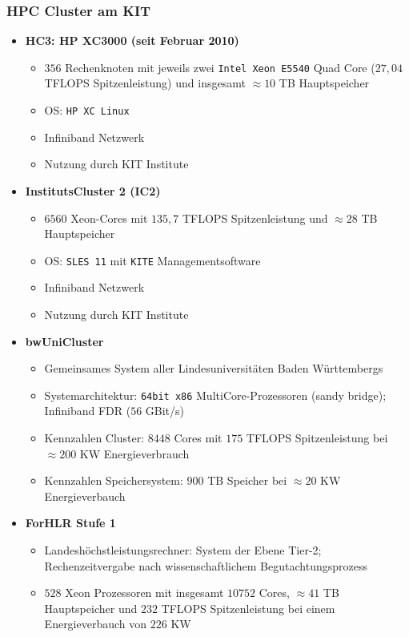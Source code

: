 \subsubsection{HPC Cluster am KIT}
\begin{itemize}
	\item \textbf{HC3: HP XC3000 (seit Februar 2010)}
	\begin{itemize}
		\item \(356\) Rechenknoten mit jeweils zwei \texttt{Intel Xeon E5540} Quad Core (\(27,04\) TFLOPS Spitzenleistung) und insgesamt \(\approx 10\) TB Hauptspeicher
		\item OS: \texttt{HP XC Linux}
		\item Infiniband Netzwerk
		\item Nutzung durch KIT Institute
	\end{itemize}
	\item \textbf{InstitutsCluster 2 (IC2)}
	\begin{itemize}
		\item \(6560\) Xeon-Cores mit \(135,7\) TFLOPS Spitzenleistung und \(\approx 28\) TB Hauptspeicher
		\item OS: \texttt{SLES 11} mit \texttt{KITE} Managementsoftware
		\item Infiniband Netzwerk
		\item Nutzung durch KIT Institute
	\end{itemize}
	\item \textbf{bwUniCluster}
	\begin{itemize}
		\item Gemeinsames System aller Lindesuniversitäten Baden Württembergs
		\item Systemarchitektur: \texttt{64bit x86} MultiCore-Prozessoren (sandy bridge); Infiniband FDR (\(56\) GBit/s)
		\item Kennzahlen Cluster: \(8448\) Cores mit \(175\) TFLOPS Spitzenleistung bei \(\approx 200\) KW Energieverbrauch
		\item Kennzahlen Speichersystem: \(900\) TB Speicher bei \(\approx 20\) KW Energieverbauch
	\end{itemize}
	\item \textbf{ForHLR Stufe 1}
	\begin{itemize}
		\item Landeshöchstleistungsrechner: System der Ebene Tier-2; Rechenzeitvergabe nach wissenschaftlichem Begutachtungsprozess
		\item \(528\) Xeon Prozessoren mit insgesamt \(10752\) Cores, \(\approx 41\) TB Hauptspeicher und \(232\) TFLOPS Spitzenleistung bei einem Energieverbauch von \(226\) KW

\end{itemize}
\end{itemize}
